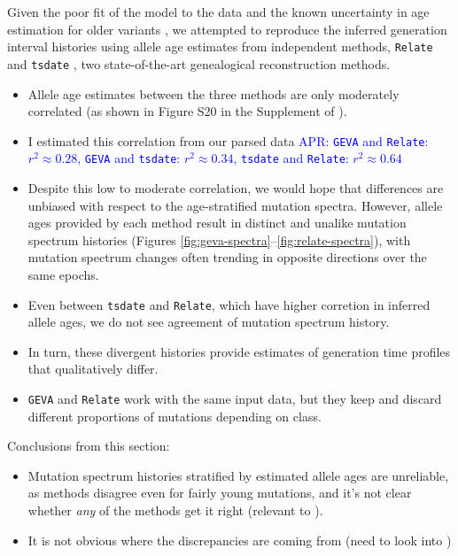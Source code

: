 \documentclass[]{article}
\newcommand{\aprcomment}[1]{{\textcolor{blue}{APR: #1}}}
\newcommand{\GEVA}{\texttt{GEVA}\xspace}
\newcommand{\tsdate}{\texttt{tsdate}\xspace}
\newcommand{\relate}{\texttt{Relate}\xspace}
\begin{document}
Given the poor fit of the model to the data and the known uncertainty in age
estimation for older variants \citep{albers2020dating}, we attempted to
reproduce the inferred generation interval histories using allele age estimates
from independent methods, \relate \citep{speidel2019method} and \tsdate
\citep{wohns2022unified}, two state-of-the-art genealogical reconstruction
methods.
\begin{itemize}
    \item Allele age estimates between the three methods are only moderately
        correlated (as shown in Figure S20 in the Supplement of
        \citet{wohns2022unified}).
    \item I estimated this correlation from our parsed data
        \aprcomment{
            \GEVA and \relate: $r^2 \approx 0.28$,
            \GEVA and \tsdate: $r^2 \approx 0.34$,
            \tsdate and \relate: $r^2 \approx 0.64$
        }
    \item Despite this low to moderate correlation, 
        we would hope that differences are
        unbiased with respect to the age-stratified mutation spectra. However,
        allele ages provided by each method result in distinct and
        unalike mutation spectrum histories (Figures
        \ref{fig:geva-spectra}--\ref{fig:relate-spectra}), with mutation
        spectrum changes often trending in opposite directions over the same
        epochs.
    \item Even between \tsdate and \relate, which have higher corretion in
        inferred allele ages, we do not see agreement of mutation spectrum
        history.
    \item In turn, these divergent histories provide estimates of
        generation time profiles that qualitatively differ.
    \item \GEVA and \relate work with the same input data, but they keep and
        discard different proportions of mutations depending on class.
\end{itemize}

Conclusions from this section:
\begin{itemize}
    \item Mutation spectrum histories stratified by estimated allele ages are
        unreliable, as methods disagree even for fairly young mutations,
        and it's not clear whether \emph{any} of the methods get
        it right (relevant to \citet{gao2022limited}).
    \item It is not obvious where the discrepancies are coming from (need
        to look into \citet{brandt2022evaluation})
\end{itemize}
\end{document}
